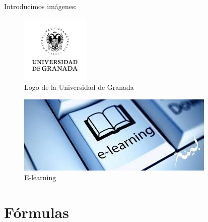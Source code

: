 \documentclass[a4paper,11pt]{article}
\begin{document}
\vspace{0.5cm}

Introducimos imágenes:

\begin{multicols}{2}
	
	\begin{figure}[H]
		\caption{Logo de la Universidad de Granada}
		\centering
		\includegraphics[width=0.5\linewidth]{ugr}
	\end{figure}

	\begin{figure}[H]
		\caption{E-learning}
		\centering
		\includegraphics[width=0.5\linewidth]{e-learning}
	\end{figure}
	
\end{multicols}


\section{Fórmulas}




\nocite{*}
\end{document}

